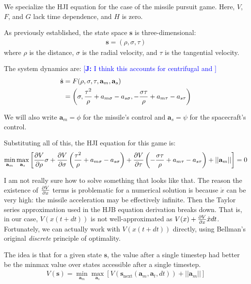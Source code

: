 \documentclass{article}
\newcommand{\authnote}[3]{\textcolor{#3}{[{\footnotesize {\bf #1:} { {#2}}}]}}
\newcommand{\jnote}[1]{\authnote{J}{#1}{blue} }
\renewcommand{\vec}[1]{\mathbf{#1}}
\begin{document}
We specialize the HJI equation for the case of the missile pursuit game.
Here, $V$, $F$, and $G$ lack time dependence, and $H$ is zero.

As previously established, the state space $\vec{s}$ is three-dimensional:
\begin{align}
\vec{s} = (\rho, \sigma, \tau)
\end{align}
where $\rho$ is the distance, $\sigma$ is the radial velocity, and $\tau$ is the
tangential velocity.

The system dynamics are: \jnote{I think this accounts for centrifugal and }
\begin{align}
\dot{\vec{s}}
&= F(\rho, \sigma, \tau, \vec{a}_m, \vec{a}_s) \notag \\
&= \left(\sigma,
  \frac{\tau^2}{\rho} + a_{m\sigma} - a_{s\sigma},
  -\frac{\sigma\tau}{\rho} + a_{m\tau} - a_{s\tau}\right)
\end{align}

We will also write $\vec{a}_m = \phi$ for the missile's control and $\vec{a}_s =
\psi$ for the spacecraft's control.

Substituting all of this, the HJI equation for this game is:
\begin{align}
\min_{\vec{a}_m} \max_{\vec{a}_s} \left[
  \pdv{V}{\rho} \sigma
+ \pdv{V}{\sigma} \left(\frac{\tau^2}{\rho} + a_{m\sigma} - a_{s\sigma}\right)
+ \pdv{V}{\tau} \left(-\frac{\sigma\tau}{\rho} + a_{m\tau} - a_{s\tau}\right)
+ ||\vec{a}_m||
\right] = 0
\end{align}

I am not really sure how to solve something that looks like that.
The reason the existence of $\pdv{V}{x}$ terms is problematic for a numerical
solution is because $\dot{x}$ can be very high: the missile acceleration may be
effectively infinite.
Then the Taylor series approximation used in the HJB equation derivation breaks
down.
That is, in our case, $V(x(t + dt))$ is not well-approximated as $V(x) +
\pdv{V}{x} \dot{x} dt$.
Fortunately, we can actually work with $V(x(t + dt))$ directly, using Bellman's
original \textit{discrete} principle of optimality.

The idea is that for a given state $\vec{s}$, the value after a single timestep
had better be the minmax value over states accessible after a single timestep.
\begin{align}
V(\vec{s}) = \min_{\vec{a}_m} \max_{\vec{a}_s} \left[
  V(\vec{s}_\text{next}(\vec{a}_m, \vec{a}_t, dt)) +
  ||\vec{a}_m||
\right]
\end{align}
\end{document}
